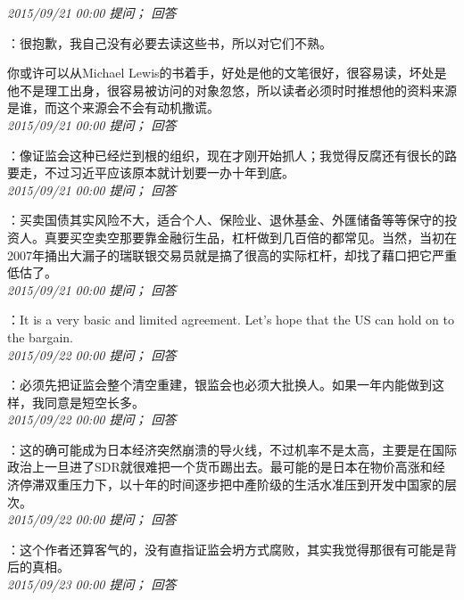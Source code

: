 \documentclass[twocolumn]{ctexart}
\begin{document}
\textit{\hfill\noindent\small 2015/09/21 00:00 提问； 回答}

：很抱歉，我自己没有必要去读这些书，所以对它们不熟。

你或许可以从Michael Lewis的书着手，好处是他的文笔很好，很容易读，坏处是他不是理工出身，很容易被访问的对象忽悠，所以读者必须时时推想他的资料来源是谁，而这个来源会不会有动机撒谎。\\

\textit{\hfill\noindent\small 2015/09/21 00:00 提问； 回答}

：像证监会这种已经烂到根的组织，现在才刚开始抓人；我觉得反腐还有很长的路要走，不过习近平应该原本就计划要一办十年到底。\\

\textit{\hfill\noindent\small 2015/09/21 00:00 提问； 回答}

：买卖国债其实风险不大，适合个人、保险业、退休基金、外匯储备等等保守的投资人。真要买空卖空那要靠金融衍生品，杠杆做到几百倍的都常见。当然，当初在2007年捅出大漏子的瑞联银交易员就是搞了很高的实际杠杆，却找了藉口把它严重低估了。\\

\textit{\hfill\noindent\small 2015/09/21 00:00 提问； 回答}

：It is a very basic and limited agreement. Let's hope that the US can hold on to the bargain.\\

\textit{\hfill\noindent\small 2015/09/22 00:00 提问； 回答}

：必须先把证监会整个清空重建，银监会也必须大批换人。如果一年内能做到这样，我同意是短空长多。\\

\textit{\hfill\noindent\small 2015/09/22 00:00 提问； 回答}

：这的确可能成为日本经济突然崩溃的导火线，不过机率不是太高，主要是在国际政治上一旦进了SDR就很难把一个货币踢出去。最可能的是日本在物价高涨和经济停滞双重压力下，以十年的时间逐步把中產阶级的生活水准压到开发中国家的层次。\\

\textit{\hfill\noindent\small 2015/09/22 00:00 提问； 回答}

：这个作者还算客气的，没有直指证监会坍方式腐败，其实我觉得那很有可能是背后的真相。\\

\textit{\hfill\noindent\small 2015/09/23 00:00 提问； 回答}
\end{document}
